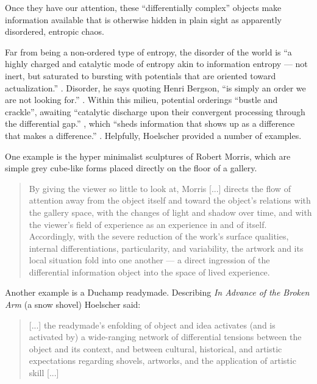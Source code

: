 \documentclass[letterpaper]{article}
\begin{document}
    Once they have our attention, these “differentially complex” \citep[p.74]{HoelscherArtAsInfrmtn2021} objects make information available that is otherwise hidden in plain sight as apparently disordered, entropic chaos.
    
    Far from being a non-ordered type of entropy, the disorder of the world is “a highly charged and catalytic mode of entropy akin to information entropy — not inert, but saturated to bursting with potentials that are oriented toward actualization.” \citep[p.72]{HoelscherArtAsInfrmtn2021}. Disorder, he says quoting Henri Bergson, “is simply an order we are not looking for.” \citep[p.73]{HoelscherArtAsInfrmtn2021}. Within this milieu, potential orderings “bustle and crackle”, awaiting “catalytic discharge upon their convergent processing through the differential gap.” \citep[p.73]{HoelscherArtAsInfrmtn2021}, which “sheds information that shows up as a difference that makes a difference.” \citep[p.75]{HoelscherArtAsInfrmtn2021}. Helpfully, Hoelscher provided a number of examples.

    One example is the hyper minimalist sculptures of Robert Morris, which are simple grey cube-like forms placed directly on the floor of a gallery.

    \begin{quote}
        By giving the viewer so little to look at, Morris [...] directs the flow of attention away from the object itself and toward the object's relations with the gallery space, with the changes of light and shadow over time, and with the viewer's field of experience as an experience in and of itself. Accordingly, with the severe reduction of the work's surface qualities, internal differentiations, particularity, and variability, the artwork and its local situation fold into one another — a direct ingression of the differential information object into the space of lived experience. \citep[p.78]{HoelscherArtAsInfrmtn2021}
    \end{quote}

    Another example is a Duchamp readymade. Describing \emph{In Advance of the Broken Arm} (a snow shovel) Hoelscher said:

    \begin{quote}
        [...] the readymade's enfolding of object and idea activates (and is activated by) a wide-ranging network of differential tensions between the object and its context, and between cultural, historical, and artistic expectations regarding shovels, artworks, and the application of artistic skill [...]
    \end{quote}
\end{document}
